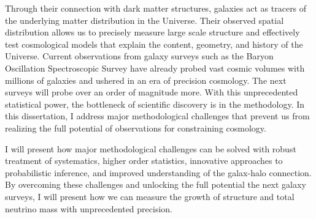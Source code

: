 Through their connection with dark matter structures, galaxies act as 
tracers of the underlying matter distribution in the Universe. Their 
observed spatial distribution allows us to precisely measure large scale 
structure and effectively test cosmological models that explain the content, 
geometry, and history of the Universe. Current observations from galaxy 
surveys such as the Baryon Oscillation Spectroscopic Survey
have already probed vast cosmic volumes with millions of galaxies 
and ushered in an era of precision cosmology. The next surveys will 
probe over an order of magnitude more. With this unprecedented statistical 
power, the bottleneck of scientific discovery is in the methodology.
In this dissertation, I address major methodological challenges that 
prevent us from realizing the full potential of observations for 
constraining cosmology. 

I will present how major methodological challenges can be solved with robust 
treatment of systematics, higher order statistics, innovative approaches to 
probabilistic inference, and improved understanding of the galax-halo connection. 
By overcoming these challenges and unlocking the full potential the next galaxy 
surveys, I will present how we can measure the growth of structure and total 
neutrino mass with unprecedented precision.


